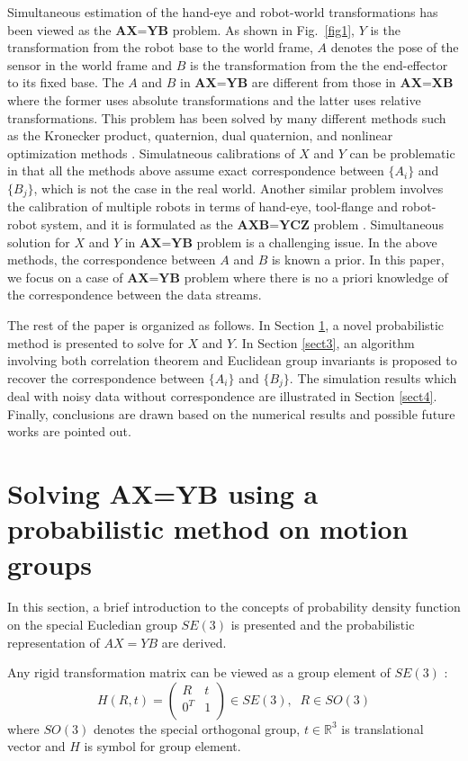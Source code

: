 \documentclass[letterpaper, 10 pt, conference]{ieeeconf}  %
\begin{document}
Simultaneous estimation of the hand-eye and robot-world transformations has been viewed as the $\textbf{AX=YB}$ problem. As shown in Fig.~\ref{fig1}, $Y$ is the transformation from the robot base to the world frame, $A$ denotes the pose of the sensor in the world frame and $B$ is the transformation from the the end-effector to its fixed base. The $A$ and $B$ in $\textbf{AX=YB}$ are different from those in $\textbf{AX=XB}$ where the former uses absolute transformations and the latter uses relative transformations. This problem has been solved by many different methods such as the Kronecker product, quaternion, dual quaternion, and nonlinear optimization methods \cite{Zhuang1994,dornaika1998simultaneous,Hirsh2001, ernst2012non,strobl2006optimal,Li2010,Shah2013,Heller2014}. Simulatneous calibrations of $X$ and $Y$ can be problematic in that all the methods above assume exact correspondence between $\{A_i\}$ and $\{B_j\}$, which is not the case in the real world. Another similar problem involves the calibration of multiple robots in terms of hand-eye, tool-flange and robot-robot system, and it is formulated as the $\textbf{AXB=YCZ}$ problem \cite{Wang2014}. Simultaneous solution for $X$ and $Y$ in $\textbf{AX=YB}$ problem is a challenging issue. In the above methods, the correspondence between $A$ and $B$ is known a prior. In this paper, we focus on a case of $\textbf{AX=YB}$ problem where there is  no a priori knowledge of the correspondence between the data streams.

The rest of the paper is organized as follows. In Section
\ref{sect2}, a novel probabilistic method is presented to solve for $X$ and $Y$. In Section \ref{sect3}, an algorithm involving both correlation theorem and Euclidean group invariants is proposed to recover the correspondence between $\{A_i\}$ and $\{B_j\}$. The simulation results which deal with noisy data without correspondence are illustrated in Section \ref{sect4}. Finally, conclusions are drawn based on the numerical results and possible future works are pointed out.

\section{Solving AX=YB using a probabilistic method on motion groups}
\label{sect2}
In this section, a brief introduction to the concepts of probability density function on the special Eucledian group $SE(3)$ is presented and the probabilistic representation of $AX=YB$ are derived.

Any rigid transformation matrix can be viewed as a group element of $SE(3)$ :
\begin{equation}\label{equ0}
    H(R,t)=\left(
             \begin{array}{cc}
               R & t \\
               0^{T} & 1 \\
             \end{array}
           \right) \in SE(3), \; \; R \in SO(3)
\end{equation}
where $SO(3)$ denotes the special orthogonal group, $t \in \mathbb{R}^3 $ is translational vector and $H$ is symbol for group element.
\end{document}
